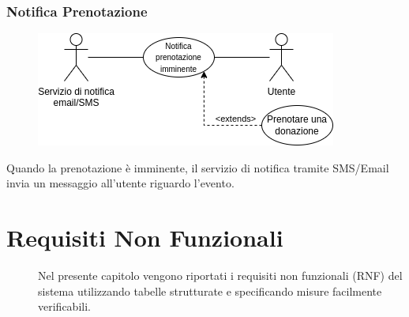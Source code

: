 \documentclass{article}
\begin{document}
\subsubsection{Notifica Prenotazione}\label{rf_11}
\begin{description}
	
	\begin{figure}[htp]
		\centering
		\includegraphics[]{rf11.png}
	\end{figure}
		
	\item Quando la prenotazione è imminente, il servizio di notifica tramite SMS/Email invia un messaggio all'utente riguardo l'evento.
\end{description}
\clearpage


\section{Requisiti Non Funzionali}
\begin{description}
	\item[] Nel presente capitolo vengono riportati i requisiti non funzionali (RNF) del sistema utilizzando tabelle strutturate e specificando misure facilmente verificabili. 
\end{description}

\renewcommand\thesubsubsection{RNF \arabic{subsubsection}}
\end{document}
